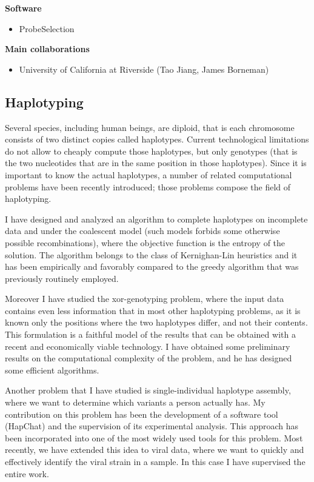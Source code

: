 \documentclass[11pt,a4paper,roman]{moderncv}
\begin{document}
\textbf{Software}

\begin{itemize}
	\item
	      ProbeSelection
\end{itemize}


\textbf{Main collaborations}

\begin{itemize}
	\item
	      University of California at Riverside (Tao Jiang, James Borneman)
\end{itemize}

\subsection{Haplotyping}\label{haplotyping}

Several species, including human beings, are diploid, that is each
chromosome consists of two distinct copies called haplotypes. Current
technological limitations do not allow to cheaply compute those
haplotypes, but only genotypes (that is the two nucleotides that are in
the same position in those haplotypes). Since it is important to know
the actual haplotypes, a number of related computational problems have
been recently introduced; those problems compose the field of
haplotyping.

I have designed and analyzed an algorithm to complete haplotypes on
incomplete data and under the coalescent model (such models forbids some
otherwise possible recombinations), where the objective function is the
entropy of the solution. The algorithm belongs to the class of
Kernighan-Lin heuristics and it has been empirically and favorably
compared to the greedy algorithm that was previously routinely employed.

Moreover I have studied the xor-genotyping problem, where the input data
contains even less information that in most other haplotyping problems,
as it is known only the positions where the two haplotypes differ, and
not their contents. This formulation is a faithful model of the results
that can be obtained with a recent and economically viable technology.
I have obtained some preliminary results on the computational complexity
of the problem, and he has designed some efficient algorithms.

Another problem that I have studied is single-individual haplotype assembly, where we want to
determine which variants a person actually has.
My contribution on this problem has been the development of a software tool
(HapChat) and the supervision of its experimental analysis.
This approach has been incorporated into one of the most widely used tools for
this problem.
Most recently, we have extended this idea to viral data, where we want to
quickly and effectively identify the viral strain in a sample.
In this case I have supervised the entire work.
\end{document}
